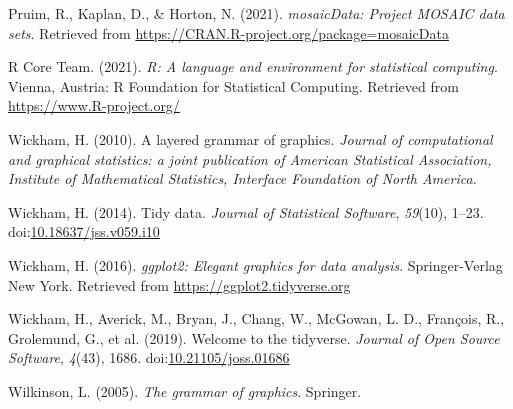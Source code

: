 \documentclass[10pt,a4paper,onecolumn]{article}
\newlength{\cslhangindent}
\newenvironment{CSLReferences}[2] %
 {%
  \setlength{\parindent}{0pt}
  \ifodd #1 \everypar{\setlength{\hangindent}{\cslhangindent}}\ignorespaces\fi
  \ifnum #2 > 0
  \setlength{\parskip}{#2\baselineskip}
  \fi
 }%
 {}
\begin{document}
\hypertarget{refs}{}
\begin{CSLReferences}{1}{0}
\leavevmode{}%
Pruim, R., Kaplan, D., \& Horton, N. (2021). \emph{mosaicData: Project
MOSAIC data sets}. Retrieved from
\url{https://CRAN.R-project.org/package=mosaicData}

\leavevmode{}%
R Core Team. (2021). \emph{R: A language and environment for statistical
computing}. Vienna, Austria: R Foundation for Statistical Computing.
Retrieved from \url{https://www.R-project.org/}

\leavevmode{}%
Wickham, H. (2010). A layered grammar of graphics. \emph{Journal of
computational and graphical statistics: a joint publication of American
Statistical Association, Institute of Mathematical Statistics, Interface
Foundation of North America}.

\leavevmode{}%
Wickham, H. (2014). Tidy data. \emph{Journal of Statistical Software},
\emph{59}(10), 1--23.
doi:\href{https://doi.org/10.18637/jss.v059.i10}{10.18637/jss.v059.i10}

\leavevmode{}%
Wickham, H. (2016). \emph{ggplot2: Elegant graphics for data analysis}.
Springer-Verlag New York. Retrieved from
\url{https://ggplot2.tidyverse.org}

\leavevmode{}%
Wickham, H., Averick, M., Bryan, J., Chang, W., McGowan, L. D.,
François, R., Grolemund, G., et al. (2019). Welcome to the {tidyverse}.
\emph{Journal of Open Source Software}, \emph{4}(43), 1686.
doi:\href{https://doi.org/10.21105/joss.01686}{10.21105/joss.01686}

\leavevmode{}%
Wilkinson, L. (2005). \emph{The grammar of graphics}. Springer.

\end{CSLReferences}
\end{document}
